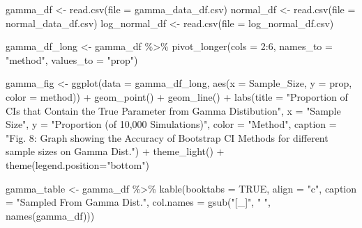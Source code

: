 \documentclass[12pt]{article}
\newenvironment{Shaded}{\begin{snugshade}}{\end{snugshade}}
\newcommand{\AttributeTok}[1]{\textcolor[rgb]{0.77,0.63,0.00}{#1}}
\newcommand{\ConstantTok}[1]{\textcolor[rgb]{0.00,0.00,0.00}{#1}}
\newcommand{\DecValTok}[1]{\textcolor[rgb]{0.00,0.00,0.81}{#1}}
\newcommand{\FunctionTok}[1]{\textcolor[rgb]{0.00,0.00,0.00}{#1}}
\newcommand{\NormalTok}[1]{#1}
\newcommand{\OtherTok}[1]{\textcolor[rgb]{0.56,0.35,0.01}{#1}}
\newcommand{\SpecialCharTok}[1]{\textcolor[rgb]{0.00,0.00,0.00}{#1}}
\newcommand{\StringTok}[1]{\textcolor[rgb]{0.31,0.60,0.02}{#1}}
\begin{document}
\begin{Shaded}
\begin{Highlighting}[]
\NormalTok{gamma\_df }\OtherTok{\textless{}{-}} \FunctionTok{read.csv}\NormalTok{(}\AttributeTok{file =} \StringTok{\textquotesingle{}gamma\_data\_df.csv\textquotesingle{}}\NormalTok{)}
\NormalTok{normal\_df }\OtherTok{\textless{}{-}} \FunctionTok{read.csv}\NormalTok{(}\AttributeTok{file =} \StringTok{\textquotesingle{}normal\_data\_df.csv\textquotesingle{}}\NormalTok{)}
\NormalTok{log\_normal\_df }\OtherTok{\textless{}{-}} \FunctionTok{read.csv}\NormalTok{(}\AttributeTok{file =} \StringTok{\textquotesingle{}log\_normal\_df.csv\textquotesingle{}}\NormalTok{)}

\NormalTok{gamma\_df\_long }\OtherTok{\textless{}{-}}\NormalTok{ gamma\_df }\SpecialCharTok{\%\textgreater{}\%}
  \FunctionTok{pivot\_longer}\NormalTok{(}\AttributeTok{cols =} \DecValTok{2}\SpecialCharTok{:}\DecValTok{6}\NormalTok{, }\AttributeTok{names\_to =} \StringTok{"method"}\NormalTok{, }\AttributeTok{values\_to =} \StringTok{"prop"}\NormalTok{) }
    
\NormalTok{gamma\_fig }\OtherTok{\textless{}{-}} \FunctionTok{ggplot}\NormalTok{(}\AttributeTok{data =}\NormalTok{ gamma\_df\_long, }
                    \FunctionTok{aes}\NormalTok{(}\AttributeTok{x =}\NormalTok{ Sample\_Size, }\AttributeTok{y =}\NormalTok{ prop, }\AttributeTok{color =}\NormalTok{ method)) }\SpecialCharTok{+} 
  \FunctionTok{geom\_point}\NormalTok{() }\SpecialCharTok{+} \FunctionTok{geom\_line}\NormalTok{() }\SpecialCharTok{+} 
  \FunctionTok{labs}\NormalTok{(}\AttributeTok{title =} \StringTok{"Proportion of CIs that Contain the True Parameter from Gamma }
\StringTok{       Distibution"}\NormalTok{, }\AttributeTok{x =} \StringTok{"Sample Size"}\NormalTok{, }
       \AttributeTok{y =} \StringTok{"Proportion (of 10,000 Simulations)"}\NormalTok{, }\AttributeTok{color =} \StringTok{"Method"}\NormalTok{,}
       \AttributeTok{caption =} \StringTok{"Fig. 8: Graph showing the Accuracy of Bootstrap CI Methods for different sample sizes on Gamma Dist."}\NormalTok{) }\SpecialCharTok{+}
  \FunctionTok{theme\_light}\NormalTok{() }\SpecialCharTok{+}
  \FunctionTok{theme}\NormalTok{(}\AttributeTok{legend.position=}\StringTok{"bottom"}\NormalTok{)}
      
\NormalTok{gamma\_table }\OtherTok{\textless{}{-}}\NormalTok{ gamma\_df }\SpecialCharTok{\%\textgreater{}\%}
  \FunctionTok{kable}\NormalTok{(}\AttributeTok{booktabs =} \ConstantTok{TRUE}\NormalTok{, }\AttributeTok{align =} \StringTok{"c"}\NormalTok{, }\AttributeTok{caption =} \StringTok{"Sampled From Gamma Dist."}\NormalTok{, }
        \AttributeTok{col.names =} \FunctionTok{gsub}\NormalTok{(}\StringTok{"[\_]"}\NormalTok{, }\StringTok{" "}\NormalTok{, }\FunctionTok{names}\NormalTok{(gamma\_df))) }
    

\end{Highlighting}
\end{Shaded}
\end{document}
